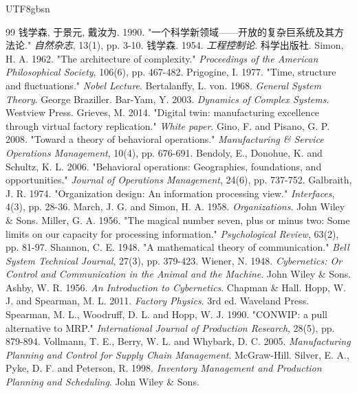 \documentclass[11pt,a4paper]{article}
\begin{document}
\begin{CJK*}{UTF8}{gbsn}

\begin{thebibliography}{99}
 钱学森, 于景元, 戴汝为. 1990. "一个科学新领域——开放的复杂巨系统及其方法论." \textit{自然杂志}, 13(1), pp. 3-10.
 钱学森. 1954. \textit{工程控制论}. 科学出版社.
 Simon, H. A. 1962. "The architecture of complexity." \textit{Proceedings of the American Philosophical Society}, 106(6), pp. 467-482.
 Prigogine, I. 1977. "Time, structure and fluctuations." \textit{Nobel Lecture}.
 Bertalanffy, L. von. 1968. \textit{General System Theory}. George Braziller.
 Bar-Yam, Y. 2003. \textit{Dynamics of Complex Systems}. Westview Press.
 Grieves, M. 2014. "Digital twin: manufacturing excellence through virtual factory replication." \textit{White paper}.
 Gino, F. and Pisano, G. P. 2008. "Toward a theory of behavioral operations." \textit{Manufacturing \& Service Operations Management}, 10(4), pp. 676-691.
 Bendoly, E., Donohue, K. and Schultz, K. L. 2006. "Behavioral operations: Geographies, foundations, and opportunities." \textit{Journal of Operations Management}, 24(6), pp. 737-752.
 Galbraith, J. R. 1974. "Organization design: An information processing view." \textit{Interfaces}, 4(3), pp. 28-36.
 March, J. G. and Simon, H. A. 1958. \textit{Organizations}. John Wiley \& Sons.
 Miller, G. A. 1956. "The magical number seven, plus or minus two: Some limits on our capacity for processing information." \textit{Psychological Review}, 63(2), pp. 81-97.
 Shannon, C. E. 1948. "A mathematical theory of communication." \textit{Bell System Technical Journal}, 27(3), pp. 379-423.
 Wiener, N. 1948. \textit{Cybernetics: Or Control and Communication in the Animal and the Machine}. John Wiley \& Sons.
 Ashby, W. R. 1956. \textit{An Introduction to Cybernetics}. Chapman \& Hall.
 Hopp, W. J. and Spearman, M. L. 2011. \textit{Factory Physics}. 3rd ed. Waveland Press.
 Spearman, M. L., Woodruff, D. L. and Hopp, W. J. 1990. "CONWIP: a pull alternative to MRP." \textit{International Journal of Production Research}, 28(5), pp. 879-894.
 Vollmann, T. E., Berry, W. L. and Whybark, D. C. 2005. \textit{Manufacturing Planning and Control for Supply Chain Management}. McGraw-Hill.
 Silver, E. A., Pyke, D. F. and Peterson, R. 1998. \textit{Inventory Management and Production Planning and Scheduling}. John Wiley \& Sons.

\end{thebibliography}
\end{CJK*}
\end{document}
